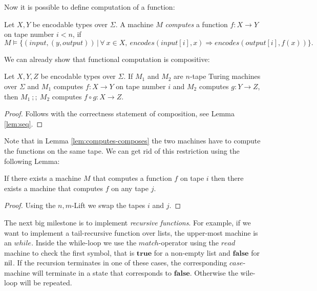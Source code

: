 \documentclass{psartcl}
\newcommand{\nil}{\M{nil}}
\newcommand{\setOf}[1]{\bigl \{ #1 \bigr \}}
\newcommand{\setMap}[2]{\setOf{#1 \,\big|\, #2}}
\newcommand{\from}{:}
\renewcommand{\to}{\rightarrow}
\newcommand{\true}{\mathbf{true}}
\newcommand{\false}{\mathbf{false}}
\newcommand{\mseq}{~;;~}
\begin{document}
Now it is possible to define computation of a function:
\begin{definition}
  \label{def:computes}
  Let $X, Y$ be encodable types over $\Sigma$.  A machine $M$ \emph{computes} a function $f \from X \to Y$ on tape number $i < n$, if
  $$M \vDash \setMap{(input, (y, output))}{\forall~x \in X,~ encodes(input[i], x) \Rightarrow encodes(output[i], f(x))}.$$
\end{definition}

We can already show that functional computation is compositive:
\begin{lemma}
  \label{lem:computes-composes}
  Let $X, Y, Z$ be encodable types over $\Sigma$.  If $M_1$ and $M_2$ are $n$-tape Turing machines over $\Sigma$ and $M_1$ computes
  $f \from X \to Y$ on tape number $i$ and $M_2$ computes $g \from Y \to Z$, then $M_1 \mseq M_2$ computes $f \circ g \from X \to Z$.
\end{lemma}
\begin{proof}
  Follows with the correctness statement of composition, see Lemma \ref{lem:seq}.
\end{proof}

Note that in Lemma \ref{lem:computes-composes} the two machines have to compute the functions on the same tape.  We can get rid of this restriction
using the following Lemma:
\begin{lemma}
  If there exists a machine $M$ that computes a function $f$ on tape $i$ then there exists a machine that computes $f$ on any tape $j$.
\end{lemma}
\begin{proof}
  Using the $n,m$-Lift we swap the tapes $i$ and $j$.
\end{proof}

The next big milestone is to implement \emph{recursive functions}.  For example, if we want to implement a tail-recursive function over lists, the
upper-most machine is an $while$.  Inside the while-loop we use the $match$-operator using the $read$ machine to check the first symbol, that is
$\true$ for a non-empty list and $\false$ for $\nil$.  If the recursion terminates in one of these cases, the corresponding $case$-machine will
terminate in a state that corresponds to $\false$.  Otherwise the wile-loop will be repeated.
\end{document}
